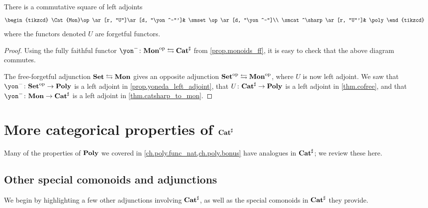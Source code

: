\documentclass[Book-Poly]{subfiles}
\begin{document}
\begin{proposition}\label{prop.traj_mon_poly}
There is a commutative square of left adjoints
\[
\begin{tikzcd}
	\Cat{Mon}\op\ar[r, "U"]\ar[d, "\yon^-"']&
	\smset\op\ar[d, "\yon^-"]\\
	\smcat^\sharp\ar[r, "U"']&
	\poly
\end{tikzcd}
\]
where the functors denoted $U$ are forgetful functors.
\end{proposition}
\begin{proof}
Using the fully faithful functor $\yon^-\colon\Cat{Mon}\op\fromto\smcat^\sharp$ from \cref{prop.monoids_ff}, it is easy to check that the above diagram commutes. 

The free-forgetful adjunction $\mathbf{Set}\leftrightarrows\mathbf{Mon}$ gives an opposite adjunction $\mathbf{Set}^{\textnormal{op}}\leftrightarrows\mathbf{Mon}^{\textnormal{op}}$, where $U$ is now left adjoint. We saw that $\yon^-\colon\smset\op\to\poly$ is a left adjoint in \cref{prop.yoneda_left_adjoint}, that $U\colon\mathbf{Cat}^\sharp\to\mathbf{Poly}$ is a left adjoint in \cref{thm.cofree}, and that $\yon^-\colon\Cat{Mon}\to\smcat^\sharp$ is a left adjoint in \cref{thm.catsharp_to_mon}.
\end{proof}

\section{More categorical properties of $\mathbf{Cat}^\sharp$}

Many of the properties of $\mathbf{Poly}$ we covered in \cref{ch.poly.func_nat,ch.poly.bonus} have analogues in $\mathbf{Cat}^\sharp$; we review these here.

\subsection{Other special comonoids and adjunctions}

We begin by highlighting a few other adjunctions involving $\mathbf{Cat}^\sharp$, as well as the special comonoids in $\mathbf{Cat}^\sharp$ they provide.
\end{document}
